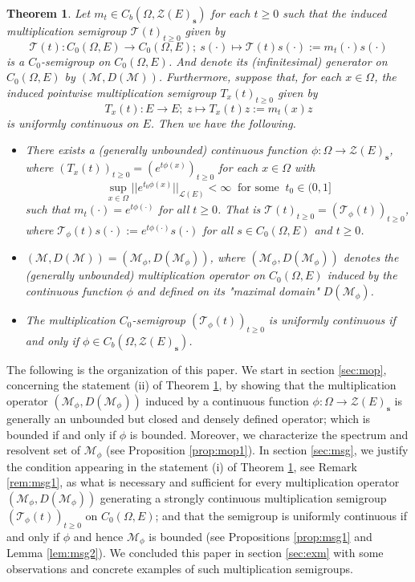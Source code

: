 \documentclass{article}
\newtheorem{theorem}{Theorem}
\newcommand{\Bm}[1]{ \boldsymbol{ #1 }}
\newcommand{\sL}{\mathscr{L}}
\newcommand{\mZ}{\mathcal{Z}}
\newcommand{\mM}{\mathcal{M}}
\newcommand{\mT}{\mathcal{T}}
\newcommand{\ty}{\infty}
\newcommand{\cd}{\cdot}
\newcommand{\lo}{\longrightarrow}
\newcommand{\Om}{\Omega}
\newcommand{\mt}{\mapsto}
\newcommand{\bei}{\begin{itemize}}
\newcommand{\eei}{\end{itemize}}
\begin{document}
\begin{theorem}\label{thm1}
	Let  $m_t\in C_b(\Om, \Bm{\mZ}(E)_\textbf{s})$ for each $t\ge0$ such that the induced multiplication semigroup $\mT(t)_{t\ge0}$ given by
\[ \mT(t) : C_0(\Om, E) \lo C_0(\Om, E);\ s(\cd)\mt \mT(t)s(\cd):=m_t(\cd)s(\cd)     \]
is a $C_0$-semigroup on $C_0(\Om, E)$. And denote its (infinitesimal) generator  on $C_0(\Om, E)$ by $(\mM, D(\mM))$. Furthermore, suppose that, for each $x\in\Om$, the induced pointwise multiplication semigroup $T_x(t)_{t\ge0}$ given by
\[T_x(t): E \lo E;\ z\mt T_x(t)z:=m_t(x)z    \]
is uniformly continuous on $E$.
Then we have the following.

\bei
\item[(i)] There exists a (generally unbounded) continuous function $\phi : \Om \lo  \Bm{\mZ}(E)_\textbf{s}$, where $(T_x(t))_{t\ge 0}= (e^{t\phi(x)}  )_{t\ge 0}$ for each $x\in\Om$ with
\[\sup_{x\in\Om}||e^{t_0\phi(x)}||_{\sL(E)}<\ty \ \text{ for some }\ t_0\in (0,1]  \]
such that $m_t(\cd)= e^{t\phi(\cd)}$ for all $t\ge0$. That is $\mT(t)_{t\ge0} =(\mT_\phi(t))_{t\ge 0}$, where $\mT_\phi(t)s(\cd):= e^{t\phi(\cd)}s(\cd)$ for all $s\in C_0(\Om, E)$ and $t\ge0$.

\item[(ii)]  $(\mM, D(\mM)) = (\mM_\phi,  D(\mM_\phi)  ) $, where $(\mM_\phi,  D(\mM_\phi)  )$ denotes the (generally unbounded)  multiplication operator on $C_0(\Om, E)$ induced by the continuous function $\phi$ and defined on its "maximal domain" $D(\mM_\phi)$.

\item[(iii)]   The multiplication $C_0$-semigroup $(\mT_\phi(t))_{t\ge 0}$ is uniformly continuous if and only if $\phi\in C_b(\Om, \Bm{\mZ}(E)_\textbf{s})$.

\eei	
	
\end{theorem}
	\bigskip  
	
	
	The following is the organization of this paper. We start in section \ref{sec:mop}, concerning the statement (ii) of Theorem \ref{thm1}, by showing that the multiplication operator $(\mM_\phi,  D(\mM_\phi)  )$ induced by a continuous function $\phi : \Om \lo  \Bm{\mZ}(E)_\textbf{s}$ is generally an unbounded but closed and densely defined operator; which is bounded if and only if $\phi$ is bounded. Moreover, we characterize the spectrum and resolvent set of $\mM_\phi$ (see Proposition \ref{prop:mop1}). In section \ref{sec:msg}, we justify the condition appearing in the statement (i)  of Theorem \ref{thm1}, see Remark \ref{rem:msg1}, as what is necessary and sufficient for every  multiplication operator $(\mM_\phi,  D(\mM_\phi)  )$ generating a strongly continuous multiplication semigroup  $(\mT_\phi(t))_{t\ge 0}$ on $C_0(\Om, E)$; and that the semigroup is uniformly continuous if and only if $\phi$ and hence  $\mM_\phi$ is bounded (see Propositions \ref{prop:msg1} and Lemma \ref{lem:msg2}). We concluded this paper in section \ref{sec:exm} with some observations and concrete examples of such multiplication semigroups.
	
\end{document}

